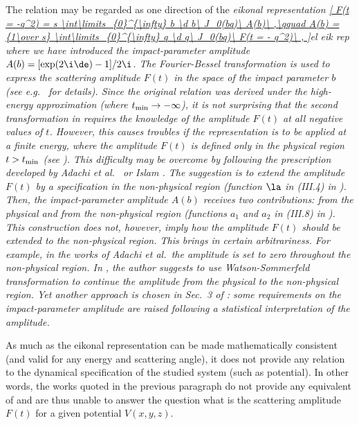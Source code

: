 The relation  may be regarded as one direction of the \em{eikonal representation}
\eqref{
	F(t = -q^2) = s \int\limits_{0}^{\infty} b \d b\ J_0(bq)\ A(b)\ ,\qquad
	A(b) = {1\over s} \int\limits_{0}^{\infty} q \d q\ J_0(bq)\ F(t = - q^2)\ ,
}{el eik rep}
where we have introduced the \em{impact-parameter amplitude} $A(b) = [\exp(2\i\de) - 1] / 2\i$.  The Fourier-Bessel transformation is used to express the scattering amplitude $F(t)$ in the space of the impact parameter $b$ (see e.g.~ for details). Since the original relation  was derived under the high-energy approximation (where $t_{\rm min} \to -\infty$), it is not surprising that the second transformation in  requires the knowledge of the amplitude $F(t)$ at all negative values of $t$. However, this causes troubles if the representation is to be applied at a finite energy, where the amplitude $F(t)$ is defined only in the physical region $t > t_{\rm min}$ (see ). This difficulty may be overcome by following the prescription developed by Adachi et al.\  or Islam . The suggestion is to extend the amplitude $F(t)$ by a specification in the non-physical region (function $\la$ in (III.4) in ). Then, the impact-parameter amplitude $A(b)$ receives two contributions: from the physical and from the non-physical region (functions $a_1$ and $a_2$ in (III.8) in ). This construction does not, however, imply how the amplitude $F(t)$ should be extended to the non-physical region. This brings in certain arbitrariness. For example, in the works of Adachi et al.~the amplitude is set to zero throughout the non-physical region. In , the author suggests to use Watson-Sommerfeld transformation to continue the amplitude from the physical to the non-physical region. Yet another approach is chosen in Sec.~3 of : some requirements on the impact-parameter amplitude are raised following a statistical interpretation of the amplitude.

As much as the eikonal representation  can be made mathematically consistent (and valid for any energy and scattering angle), it does not provide any relation to the dynamical specification of the studied system (such as potential). In other words, the works quoted in the previous paragraph do not provide any equivalent of  and are thus unable to answer the question what is the scattering amplitude $F(t)$ for a given potential $V(x, y, z)$.

